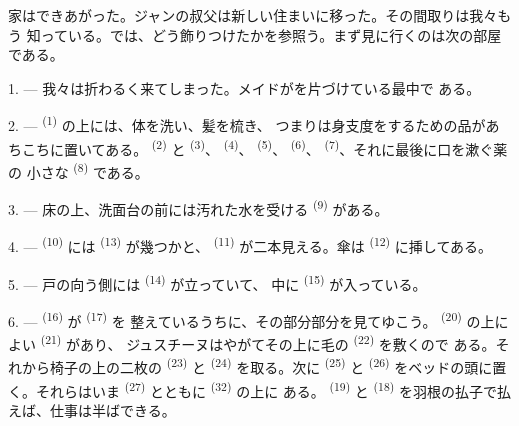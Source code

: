 %

\VUsaut{6.0mm}
\VUsaut{1.4mm}
\VUsaut{0.4mm}
\VUsaut{2.2mm}

家はできあがった。ジャンの叔父は新しい住まいに移った。その間取りは我々もう
知っている。では、どう飾りつけたかを参照う。まず見に行くのは次の部屋である。

\VUsaut{3.0mm}

1. --- 我々は折わるく来てしまった。メイドがを片づけている最中で
ある。

2. ---  \textsuperscript{(1)} の上には、体を洗い、髪を梳き、
つまりは身支度をするための品があちこちに置いてある。
\textsuperscript{(2)} と \textsuperscript{(3)}、
\textsuperscript{(4)}、 \textsuperscript{(5)}、
\textsuperscript{(6)}、 \textsuperscript{(7)}、それに最後に口を漱ぐ薬の
小さな \textsuperscript{(8)} である。

3. --- 床の上、洗面台の前には汚れた水を受ける \textsuperscript{(9)}
がある。

4. ---  \textsuperscript{(10)} には \textsuperscript{(13)}
が幾つかと、 \textsuperscript{(11)} が二本見える。傘は
\textsuperscript{(12)} に挿してある。

5. --- 戸の向う側には \textsuperscript{(14)} が立っていて、
中に \textsuperscript{(15)} が入っている。

6. ---  \textsuperscript{(16)} が \textsuperscript{(17)} を
整えているうちに、その部分部分を見てゆこう。
\textsuperscript{(20)} の上によい \textsuperscript{(21)} があり、
ジュスチーヌはやがてその上に毛の \textsuperscript{(22)} を敷くので
ある。それから椅子の上の二枚の \textsuperscript{(23)} と
 \textsuperscript{(24)} を取る。次に \textsuperscript{(25)}
と \textsuperscript{(26)} をベッドの頭に置く。それらはいま
\textsuperscript{(27)} とともに \textsuperscript{(32)} の上に
ある。 \textsuperscript{(19)} と \textsuperscript{(18)}
を羽根の払子で払えば、仕事は半ばできる。

